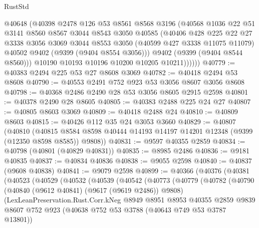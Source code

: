 \begin{lexlean}{RustStd}
\begin{coremodule}
              @40648
              (@40398
                @2478
                @126
                @53
                @8561
                @8568
                @3196
                (@40568
                  @1036
                  @22
                  @51
                  @3141
                  @8560
                  @8567
                  @3044
                  @8543
                  @3050
                  @40585
                  (@40406
                    @428
                    @225
                    @22
                    @27
                    @3338
                    @3056
                    @3069
                    @3044
                    @8553
                    @3050
                    (@40599 @427 @3338 @11075 @11079)
                    @40502
                    @9402
                    (@9399 (@9404 @8554 @3056)))
                  @9402
                  (@9399 (@9404 @8544 @8560)))
                @10190
                @10193
                @10196
                @10200
                @10205
                @10211))))))
@40779 := @40383 @2494 @225 @53 @27 @8608 @3069
@40782 := @40418 @2494 @53 @8608
@40790 := @40553 @2491 @752 @923 @53 @3056 @8607 @3056 @8608
@40798 := @40368 @2486 @2490 @28 @53 @3056 @8605 @2915 @2598
@40801 := @40378 @2490 @28 @8605
@40805 := @40383 @2488 @225 @24 @27
@40807 := @40805 @8603 @3069
@40809 := @40418 @2488 @24
@40810 := @40809 @8603
@40815 := @40426 @112 @35 @24 @3053 @3660
@40829 := @40807
    (@40810
      (@40815 @8584 @8598 @40444 @14193 @14197 @14201 @12348 (@9399 (@12350 @8598 @8585)) @9808))
@40831 := @9597 @40355 @2859
@40834 := @40798 (@40801 (@40829 @40831))
@40835 := @8985 @2486
@40836 := @9181 @40835
@40837 := @40834 @40836
@40838 := @9055 @2598
@40840 := @40837 (@9608 @40838)
@40841 := @9079 @2598
@40899 := @40366
    (@40376
      (@40381
        (@40523
          (@40529
            (@40532
              (@40539
                (@40542
                  (@40773
                    (@40779
                      (@40782
                        (@40790
                          (@40840 (@9612 @40841) (@9617 (@9619 @2486)) @9808)
                          (LexLeanPreservation.Rust.Corr.kNeg
                            @8949
                            @8951
                            @8953
                            @40355
                            @2859
                            @9839
                            @8607
                            @752
                            @923
                            (@40638 @752 @53 @3788 (@40643 @749 @53 @3787 @13801))

\end{coremodule}
\end{lexlean}
